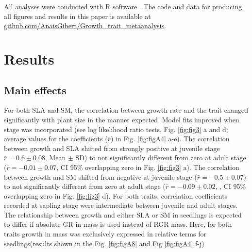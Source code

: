 \documentclass[a4paper,11pt]{article}
\newcommand{\smurl}[1]{\url{#1}}
\begin{document}
All analyses were conducted with R software \citep{Ralanguageanden:2014wf}. The code and data for producing all figures and results in this paper is available at \smurl{github.com/AnaisGibert/Growth\_trait\_metaanalysis}.

\section*{Results}\label{results}

\subsection*{Main effects}

For both SLA and SM, the correlation between growth rate and the trait changed significantly with plant size in the manner expected. Model fits improved when stage was incorporated (see log likelihood ratio tests, Fig. \ref{fig:fig3} a and d; average values for the coefficients ($\bar{r}$) in Fig. \ref{fig:figA4} a-e). The correlation between growth and SLA shifted from strongly positive at juvenile stage $\bar{r}=0.6 \pm 0.08$, Mean $\pm$ SD) to not significantly different from zero at adult stage ($\bar{r}= -0.01 \pm 0.07$, CI 95\% overlapping zero in Fig. \ref{fig:fig3} a). The correlation between growth and SM shifted from negative at juvenile stage ($\bar{r}= -0.5 \pm 0.07$) to not significantly different from zero at adult stage ($\bar{r}= -0.09 \pm 0.02$, , CI 95\% overlapping zero in Fig. \ref{fig:fig3} d). For both traits, correlation coefficients recorded at sapling stage were intermediate between juvenile and adult stages. The relationship between growth and either SLA or SM in seedlings is expected to differ if absolute GR in mass is used instead of RGR mass. Here, for both traits growth in mass was exclusively expressed in relative terms for seedlings(results shown in the Fig. \ref{fig:figA8} and Fig \ref{fig:figA4} f-j) 
\end{document}
